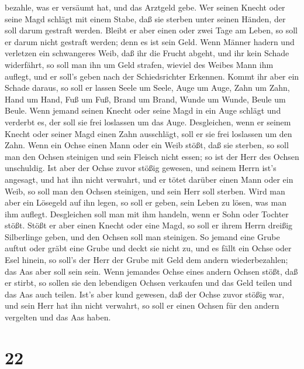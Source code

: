 bezahle, was er versäumt hat, und das Arztgeld gebe.  Wer
seinen Knecht oder seine Magd schlägt mit einem Stabe, daß sie sterben
unter seinen Händen, der soll darum gestraft werden. 
Bleibt er aber einen oder zwei Tage am Leben, so soll er darum nicht
gestraft werden; denn es ist sein Geld.  Wenn Männer hadern
und verletzen ein schwangeres Weib, daß ihr die Frucht abgeht, und ihr
kein Schade widerfährt, so soll man ihn um Geld strafen, wieviel des
Weibes Mann ihm auflegt, und er soll's geben nach der Schiedsrichter
Erkennen.  Kommt ihr aber ein Schade daraus, so soll er
lassen Seele um Seele,  Auge um Auge, Zahn um Zahn, Hand um
Hand, Fuß um Fuß,  Brand um Brand, Wunde um Wunde, Beule um
Beule.  Wenn jemand seinen Knecht oder seine Magd in ein
Auge schlägt und verderbt es, der soll sie frei loslassen um das Auge.
 Desgleichen, wenn er seinem Knecht oder seiner Magd einen
Zahn ausschlägt, soll er sie frei loslassen um den Zahn. 
Wenn ein Ochse einen Mann oder ein Weib stößt, daß sie sterben, so soll
man den Ochsen steinigen und sein Fleisch nicht essen; so ist der Herr
des Ochsen unschuldig.  Ist aber der Ochse zuvor stößig
gewesen, und seinem Herrn ist's angesagt, und hat ihn nicht verwahrt,
und er tötet darüber einen Mann oder ein Weib, so soll man den Ochsen
steinigen, und sein Herr soll sterben.  Wird man aber ein
Lösegeld auf ihn legen, so soll er geben, sein Leben zu lösen, was man
ihm auflegt.  Desgleichen soll man mit ihm handeln, wenn er
Sohn oder Tochter stößt.  Stößt er aber einen Knecht oder
eine Magd, so soll er ihrem Herrn dreißig Silberlinge geben, und den
Ochsen soll man steinigen.  So jemand eine Grube auftut
oder gräbt eine Grube und deckt sie nicht zu, und es fällt ein Ochse
oder Esel hinein,  so soll's der Herr der Grube mit Geld
dem andern wiederbezahlen; das Aas aber soll sein sein. 
Wenn jemandes Ochse eines andern Ochsen stößt, daß er stirbt, so sollen
sie den lebendigen Ochsen verkaufen und das Geld teilen und das Aas auch
teilen.  Ist's aber kund gewesen, daß der Ochse zuvor
stößig war, und sein Herr hat ihn nicht verwahrt, so soll er einen
Ochsen für den andern vergelten und das Aas haben.

\hypertarget{section-21}{%
\section{22}\label{section-21}}


